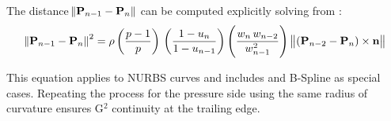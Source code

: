The distance $\norm{\mathbf{P}_{n-1}-\mathbf{P}_{n}}$ can be computed explicitly solving from :
\begin{equation}
      \norm{\mathbf{P}_{n-1}-\mathbf{P}_{n}}^{2} = \rho \left( \frac{p-1}{p}  \right) \,  \left( \frac{1-u_{n}}{1-u_{n-1}}  \right) \left(\frac{w_{n}\,w_{n-2}}{w_{n-1}^2} \right)  \, \norm{ (\mathbf{P}_{n-2}-\mathbf{P}_{n}) \times \mathbf{n}}
\end{equation}

This equation applies to NURBS curves and includes \Bezier and B-Spline as special cases. Repeating the process for the pressure side using the same radius of curvature ensures G$^2$ continuity at the trailing edge.


